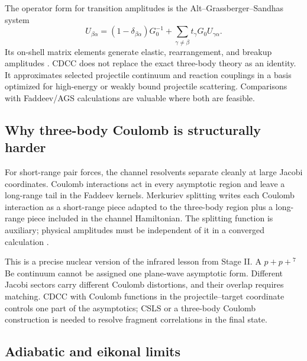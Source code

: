 The operator form for transition amplitudes is the Alt--Grassberger--Sandhas
system
\begin{equation}
  U_{\beta\alpha}
  =(1-\delta_{\beta\alpha})G_0^{-1}
  +\sum_{\gamma\neq\beta}t_\gamma G_0U_{\gamma\alpha}.
  \label{eq:ags-equations}
\end{equation}
Its on-shell matrix elements generate elastic, rearrangement, and breakup
amplitudes \cite{AltGrassbergerSandhas1967}.  CDCC does not replace the exact
three-body theory as an identity.  It approximates selected projectile
continuum and reaction couplings in a basis optimized for high-energy or
weakly bound projectile scattering.  Comparisons with Faddeev/AGS calculations
are valuable where both are feasible.

\subsection{Why three-body Coulomb is structurally harder}
\label{subsec:nuclear-three-body-coulomb}

For short-range pair forces, the channel resolvents separate cleanly at large
Jacobi coordinates.  Coulomb interactions act in every asymptotic region and
leave a long-range tail in the Faddeev kernels.  Merkuriev splitting writes
each Coulomb interaction as a short-range piece adapted to the three-body
region plus a long-range piece included in the channel Hamiltonian.  The
splitting function is auxiliary; physical amplitudes must be independent of
it in a converged calculation \cite{FaddeevMerkuriev:1993}.

This is a precise nuclear version of the infrared lesson from Stage II.  A
$p+p+{}^7$Be continuum cannot be assigned one plane-wave asymptotic form.
Different Jacobi sectors carry different Coulomb distortions, and their
overlap requires matching.  CDCC with Coulomb functions in the
projectile--target coordinate controls one part of the asymptotics; CSLS or a
three-body Coulomb construction is needed to resolve fragment correlations in
the final state.

\subsection{Adiabatic and eikonal limits}
\label{subsec:adiabatic-eikonal}

